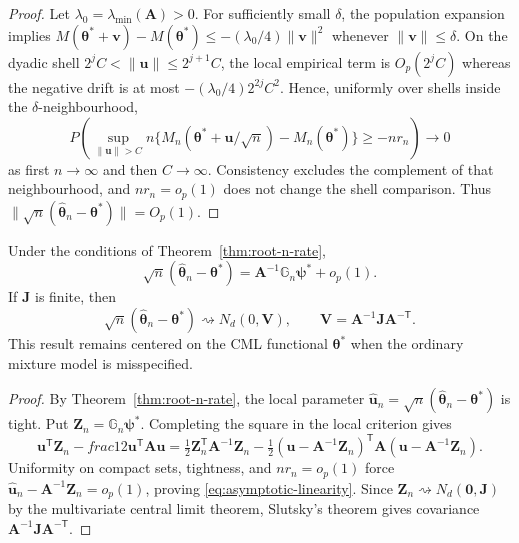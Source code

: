 \begin{proof}
Let $\lambda_0=\lambda_{\min}(\mathbf A)>0$. For sufficiently small
$\delta$, the population expansion implies
$M(\boldsymbol\theta^*+\mathbf v)-M(\boldsymbol\theta^*)
\leq-(\lambda_0/4)\|\mathbf v\|^2$ whenever $\|\mathbf v\|\leq\delta$.
On the dyadic shell
$2^jC<\|\mathbf u\|\leq2^{j+1}C$, the local empirical term is
$O_p(2^jC)$ whereas the negative drift is at most
$-(\lambda_0/4)2^{2j}C^2$. Hence, uniformly over shells inside the
$\delta$-neighbourhood,
\[
 P\!\left(\sup_{\|\mathbf u\|>C}
 n\{M_n(\boldsymbol\theta^*+\mathbf u/\sqrt n)-M_n(\boldsymbol\theta^*)\}
 \geq-nr_n\right)\longrightarrow0
\]
as first $n\to\infty$ and then $C\to\infty$. Consistency excludes the
complement of that neighbourhood, and $nr_n=o_p(1)$ does not change the shell
comparison. Thus $\|\sqrt n(\widehat{\boldsymbol\theta}_n-
\boldsymbol\theta^*)\|=O_p(1)$.
\end{proof}

\begin{theorem}
\label{thm:asymptotic-normality}
Under the conditions of Theorem~\ref{thm:root-n-rate},
\begin{equation}
 \sqrt n(\widehat{\boldsymbol{\theta}}_n-\boldsymbol{\theta}^*)
 =\mathbf{A}^{-1}\mathbb G_n\boldsymbol{\psi}^*+o_p(1).
 \label{eq:asymptotic-linearity}
\end{equation}
If $\mathbf{J}$ is finite, then
\begin{equation}
 \sqrt n(\widehat{\boldsymbol{\theta}}_n-\boldsymbol{\theta}^*)
 \rightsquigarrow N_d(0,\mathbf{V}),
 \qquad \mathbf{V}=\mathbf{A}^{-1}\mathbf{J}\mathbf{A}^{-\mathsf T}.
 \label{eq:asymptotic-normality}
\end{equation}
This result remains centered on the CML functional $\boldsymbol{\theta}^*$ when the
ordinary mixture model is misspecified.
\end{theorem}

\begin{proof}
By Theorem~\ref{thm:root-n-rate}, the local parameter
$\widehat{\mathbf{u}}_n=\sqrt n(\widehat{\boldsymbol{\theta}}_n-\boldsymbol{\theta}^*)$ is tight. Put
$\mathbf Z_n=\mathbb G_n\boldsymbol\psi^*$. Completing the square in the local
criterion gives
\[
 \mathbf u^\mathsf T\mathbf Z_n-	frac12\mathbf u^\mathsf T\mathbf A\mathbf u
 =\tfrac12\mathbf Z_n^\mathsf T\mathbf A^{-1}\mathbf Z_n
 -\tfrac12(\mathbf u-\mathbf A^{-1}\mathbf Z_n)^\mathsf T
 \mathbf A(\mathbf u-\mathbf A^{-1}\mathbf Z_n).
\]
Uniformity on compact sets, tightness, and $nr_n=o_p(1)$ force
$\widehat{\mathbf u}_n-\mathbf A^{-1}\mathbf Z_n=o_p(1)$, proving
\eqref{eq:asymptotic-linearity}. Since
$\mathbf Z_n\rightsquigarrow N_d(\mathbf0,\mathbf J)$ by the multivariate
central limit theorem, Slutsky's theorem gives covariance
$\mathbf A^{-1}\mathbf J\mathbf A^{-\mathsf T}$.
\end{proof}

